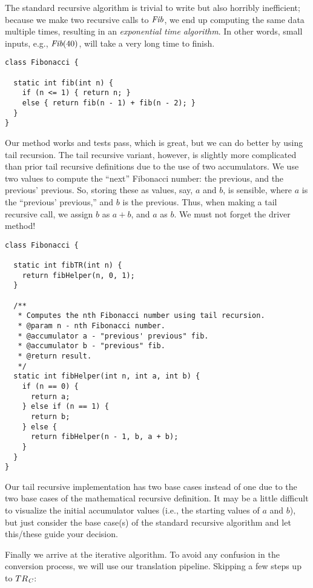The standard recursive algorithm is trivial to write but also horribly inefficient; because we make two recursive calls to $\emph{Fib}$, we end up computing the same data multiple times, resulting in an \emph{exponential time algorithm}. In other words, small inputs, e.g., $\emph{Fib}(40)$, will take a very long time to finish.

\begin{lstlisting}[language=MyJava]
class Fibonacci {

  static int fib(int n) {
    if (n <= 1) { return n; } 
    else { return fib(n - 1) + fib(n - 2); }
  }
}
\end{lstlisting}

Our method works and tests pass, which is great, but we can do better by using tail recursion. The tail recursive variant, however, is slightly more complicated than prior tail recursive definitions due to the use of two accumulators. We use two values to compute the ``next'' Fibonacci number: the previous, and the previous' previous. So, storing these as values, say, $a$ and $b$, is sensible, where $a$ is the ``previous' previous,'' and $b$ is the previous. Thus, when making a tail recursive call, we assign $b$ as $a + b$, and $a$ as $b$. We must not forget the driver method!

\begin{lstlisting}[language=MyJava]
class Fibonacci {

  static int fibTR(int n) {
    return fibHelper(n, 0, 1);
  }

  /**
   * Computes the nth Fibonacci number using tail recursion.
   * @param n - nth Fibonacci number.
   * @accumulator a - "previous' previous" fib.
   * @accumulator b - "previous" fib.
   * @return result.
   */
  static int fibHelper(int n, int a, int b) {
    if (n == 0) {
      return a;
    } else if (n == 1) {
      return b;
    } else {
      return fibHelper(n - 1, b, a + b);
    }
  }
}
\end{lstlisting}

Our tail recursive implementation has two base cases instead of one due to the two base cases of the mathematical recursive definition. It may be a little difficult to visualize the initial accumulator values (i.e., the starting values of $a$ and $b$), but just consider the base case(s) of the standard recursive algorithm and let this/these guide your decision.

Finally we arrive at the iterative algorithm. To avoid any confusion in the conversion process, we will use our translation pipeline. Skipping a few steps up to $TR_\emph{C}$:

